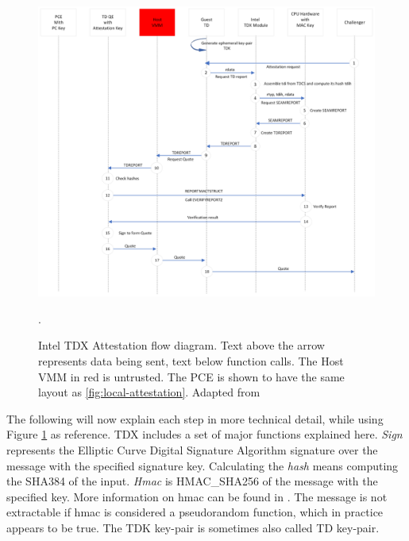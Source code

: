 \begin{figure}
\centering
\includegraphics[width=\textwidth]{figures/Attestation Diagram.png}
\caption{Intel TDX Attestation flow diagram. Text above the arrow represents data being sent, text below function calls. The Host VMM in red is untrusted. The PCE is shown to have the same layout as \cref{fig:local-attestation}. Adapted from \cite{sardar_demystifying_2021}}.
\label{fig:QuoteGeneration}
\end{figure}
The following will now explain each step in more technical detail, while using Figure \ref{fig:QuoteGeneration} as reference. 
TDX includes a set of major functions explained here. \textit{Sign} represents the Elliptic Curve Digital Signature Algorithm signature over the message with the specified signature key. 
Calculating the \textit{hash} means computing the SHA384 of the input. \textit{Hmac} is HMAC\_SHA256 of the message with the specified key. More information on hmac can be found in \cite{hmac_keying_1996}. The message is not extractable if hmac is considered a pseudorandom function, which in practice appears to be true\cite{bellare_new_2006}. The TDK key-pair is sometimes also called TD key-pair.
\newcommand\setItemnumber[1]{\setcounter{enumi}{\numexpr#1-1\relax}}
